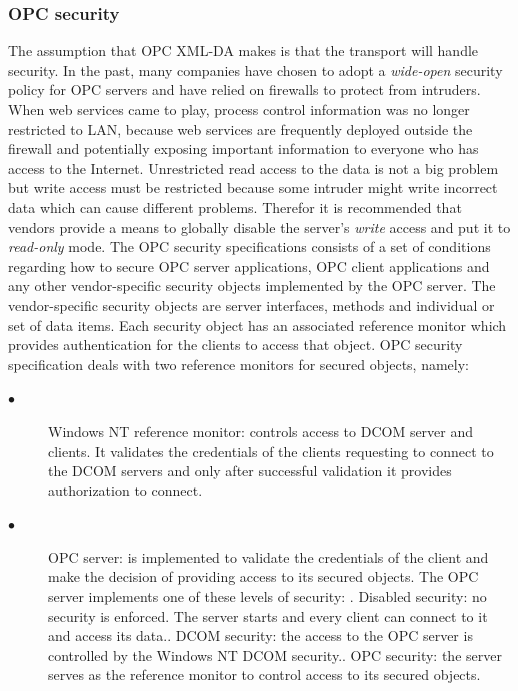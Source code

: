 \documentclass[twosided,a4,10pt]{article}
\begin{document}
\begin{multicols}{2}
	\subsubsection{OPC security}
	The assumption that OPC XML-DA makes is that the transport will handle security. In the past, many companies have chosen to adopt a \textit{wide-open} security policy for OPC servers and have relied on firewalls to protect from intruders. When web services came to play, process control information was no longer restricted to LAN, because web services are frequently deployed outside the firewall and potentially exposing important information to everyone who has access to the Internet. \newline
	Unrestricted read access to the data is not a big problem but write access must be restricted because some intruder might write incorrect data which can cause different problems. Therefor it is recommended that vendors provide a means to globally disable the server's \textit{write} access and put it to \textit{read-only} mode.\newline
	The OPC security specifications consists of a set of conditions regarding how to secure OPC server applications, OPC client applications and any other vendor-specific security objects implemented by the OPC server. The vendor-specific security objects are server interfaces, methods and individual or set of data items. Each security object has an associated reference monitor which provides authentication for the clients to access that object. OPC security specification deals with two reference monitors for secured objects, namely:
	\begin{description}
	\item[$\bullet$]
	Windows NT reference monitor: controls access to DCOM server and clients. It validates the credentials of the clients requesting to connect to the DCOM servers and only after successful validation it provides authorization to connect.
	\item[$\bullet$]
	OPC server: is implemented to validate the credentials of the client and make the decision of providing access to its secured objects. The OPC server implements one of these levels of security: . Disabled security: no security is enforced. The server starts and every client can connect to it and access its data.. DCOM security: the access to the OPC server is controlled by the Windows NT DCOM security.. OPC security: the server serves as the reference monitor to control access to its secured objects.
	\end{description}
	

\end{multicols}
\end{document}
